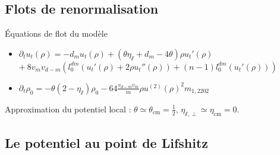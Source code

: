 \documentclass[xcolor=dvipsnames]{beamer}
\begin{document}
\subsection{Flots de renormalisation}
\begin{frame}

\begin{block}{Équations de flot du modèle}
\begin{itemize}
\item $\partial_t u_t(\rho) = -d_m u_t(\rho) + (\theta \eta_\sslash + d_m - 4 \theta) \rho u_t'(\rho)$ \\
\hfill $+~8 v_m v_{d-m} \left( l_0^{dm}\left(u_t'(\rho) + 2 \rho u_t''(\rho) \right) + (n-1)l_0^{dm}\left(u_t'(\rho)\right) \right)$
\phantom{sdsldk}
\item $\partial_t \rho_0 = -\theta \left(2-\eta_\sslash\right) \rho_0 - 64 \frac{ v_{d-m} v_m}{m} \rho u^{(2)}(\rho)^2 m_{1,2202} $


\end{itemize}
\end{block}

Approximation du potentiel local : $\theta \simeq \theta_{\text{cm}} = \frac{1}{2}$, $\eta_{\sslash, \perp} \simeq \eta_{\text{cm}} = 0$.
\end{frame}

\subsection{Le potentiel au point de Lifshitz}
\end{document}
